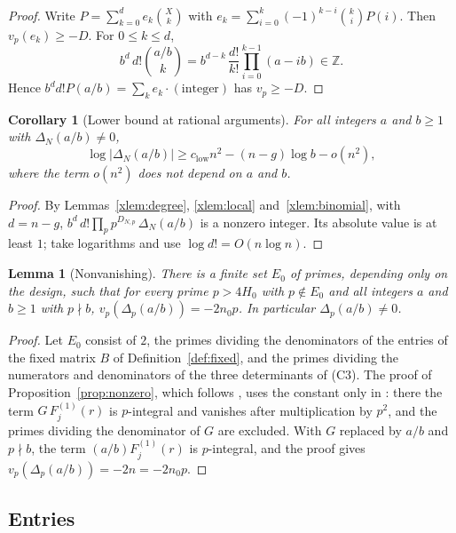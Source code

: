 \documentclass[11pt]{article}
\newtheorem{lemma}[theorem]{Lemma}
\newtheorem{corollary}[theorem]{Corollary}
\theoremstyle{definition}
\begin{document}
\begin{proof}
Write $P=\sum_{k=0}^de_k\binom Xk$ with $e_k=\sum_{i=0}^k(-1)^{k-i}\binom kiP(i)$. Then $v_p(e_k)\ge-D$. For $0\le k\le d$,
\[
b^d\,d!\binom{a/b}{k}=b^{d-k}\,\frac{d!}{k!}\prod_{i=0}^{k-1}(a-ib)\in\mathbb Z .
\]
Hence $b^dd!P(a/b)=\sum_ke_k\cdot(\text{integer})$ has $v_p\ge-D$.
\end{proof}

\begin{corollary}[Lower bound at rational arguments]\label{xcor:lower}
For all integers $a$ and $b\ge1$ with $\Delta_N(a/b)\ne0$,
\[
\log|\Delta_N(a/b)|\ge c_{\mathrm{low}}n^2-(n-g)\log b-o(n^2),
\]
where the term $o(n^2)$ does not depend on $a$ and $b$.
\end{corollary}

\begin{proof}
By Lemmas~\ref{xlem:degree}, \ref{xlem:local} and~\ref{xlem:binomial}, with $d=n-g$, $b^{d}\,d!\prod_pp^{D_{N,p}}\,\Delta_N(a/b)$ is a nonzero integer. Its absolute value is at least $1$; take logarithms and use $\log d!=O(n\log n)$.
\end{proof}

\begin{lemma}[Nonvanishing]\label{xlem:nonzero}
There is a finite set $E_0$ of primes, depending only on the design, such that for every prime $p>4H_0$ with $p\notin E_0$ and all integers $a$ and $b\ge1$ with $p\nmid b$, $v_p(\Delta_p(a/b))=-2n_0p$. In particular $\Delta_p(a/b)\ne0$.
\end{lemma}

\begin{proof}
Let $E_0$ consist of $2$, the primes dividing the denominators of the entries of the fixed matrix $B$ of Definition~\ref{def:fixed}, and the primes dividing the numerators and denominators of the three determinants of (C3). The proof of Proposition~\ref{prop:nonzero}, which follows \cite[Sec.~4]{OAI}, uses the constant only in \cite[Sec.~4.3]{OAI}: there the term $G\,F^{(1)}_j(r)$ is $p$-integral and vanishes after multiplication by $p^2$, and the primes dividing the denominator of $G$ are excluded. With $G$ replaced by $a/b$ and $p\nmid b$, the term $(a/b)F^{(1)}_j(r)$ is $p$-integral, and the proof gives $v_p(\Delta_p(a/b))=-2n=-2n_0p$.
\end{proof}

\subsection{Entries}\label{xsec:size}
\end{document}
